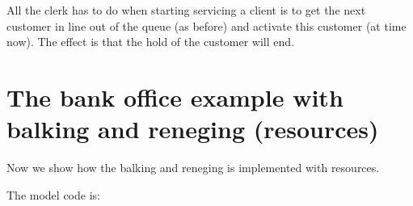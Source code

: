 \documentclass[letterpaper,10pt,english]{sphinxmanual}
\begin{document}
All the clerk has to do when starting servicing a client is to get the next customer in line
out of the queue (as before) and activate this customer (at time now). The effect is that the hold
of the customer will end.

\begin{sphinxVerbatim}[commandchars=\\\{\}]
  
\end{sphinxVerbatim}


\section{The bank office example with balking and reneging (resources)}
\label{\detokenize{Modeling:the-bank-office-example-with-balking-and-reneging-resources}}
Now we show how the balking and reneging is implemented with resources.

The model code is:
\end{document}

